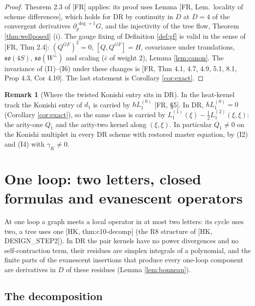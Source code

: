 \documentclass[11pt]{article}
\theoremstyle{definition}
\newtheorem{remark}[definition]{Remark}
\numberwithin{equation}{section}
\begin{document}
\begin{proof}
Theorem 2.3 of [FR] applies: its proof uses Lemma [FR, Lem.\ locality of scheme differences], which holds for DR by continuity in $D$ at $D=4$ of the convergent derivatives $\partial_p^{\,\deg+1}G$, and the injectivity of the tree flow, Theorem \ref{thm:wellposed} (i). The gauge fixing of Definition \ref{def:gf} is valid in the sense of [FR, Thm 2.4]: $(Q^{GF})^2=0$, $[Q,Q^{GF}]=H$, covariance under translations, $\mathfrak{so}(4S)$, $\mathfrak{so}(W^\perp)$ and scaling ($\bar c$ of weight $2$), Lemma \ref{lem:canon}. The invariance of (I1)--(I6) under these changes is [FR, Thm 4.1, 4.7, 4.9, 5.1, 8.1, Prop 4.3, Cor 4.10]. The last statement is Corollary \ref{cor:exact}.
\end{proof}

\begin{remark}[Where the twisted Konishi entry sits in DR]
\label{rem:twistDR}
In the heat-kernel track the Konishi entry of $d_1$ is carried by $\hbar L_1^{(0)}$ [FR, §5]. In DR, $\hbar L_1^{(0)}=0$ (Corollary \ref{cor:exact}), so the same class is carried by $L_1^{(1)}(\xi)-\frac12L_1^{(2)}(\xi,\xi)$: the arity-one $Q_1$ and the arity-two kernel along $(\xi,\xi)$. In particular $Q_1\neq0$ on the Konishi multiplet in every DR scheme with restored master equation, by (I2) and (I4) with $\gamma_K\neq0$.
\end{remark}

\section{One loop: two letters, closed formulas and evanescent operators}
\label{sec:oneloop}

At one loop a graph meets a local operator in at most two letters: its cycle uses two, a tree uses one [HK, thm:c10-decomp] (the R8 structure of [HK, DESIGN\_STEP2]). In DR the pair kernels have no power divergences and no self-contraction term, their residues are simplex integrals of a polynomial, and the finite parts of the evanescent insertions that produce every one-loop component are derivatives in $D$ of these residues (Lemma \ref{lem:bonneau}).

\subsection{The decomposition}
\end{document}
